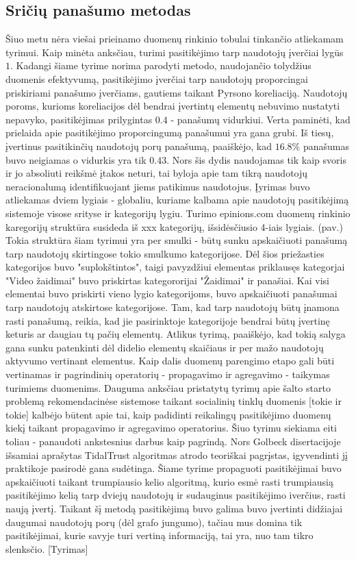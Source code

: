 \documentclass{VUMIFInfMagistrinis}
\begin{document}
\subsection{Sričių panašumo metodas}
\indent
Šiuo metu nėra viešai prieinamo duomenų rinkinio tobulai tinkančio atliekamam tyrimui.  Kaip minėta anksčiau, turimi pasitikėjimo tarp naudotojų įverčiai lygūs $1$. Kadangi šiame tyrime norima parodyti metodo, naudojančio tolydžius duomenis efektyvumą, pasitikėjimo įverčiai tarp naudotojų proporcingai priskiriami panašumo įverčiams, gautiems taikant Pyrsono koreliaciją. Naudotojų poroms, kurioms koreliacijos dėl bendrai įvertintų elementų nebuvimo nustatyti nepavyko, pasitikėjimas prilygintas $0.4$ - panašumų vidurkiui. Verta paminėti, kad prielaida apie pasitikėjimo proporcingumą panašumui yra gana grubi. Iš tiesų, įvertinus pasitikinčių naudotojų porų panašumą, paaiškėjo, kad $16.8\%$ panašumas buvo neigiamas o vidurkis yra tik  $0.43$. Nors šis dydis naudojamas tik kaip svoris ir jo absoliuti reikšmė įtakos neturi, tai byloja apie tam tikrą naudotojų neracionalumą identifikuojant jiems patikimus naudotojus. 
\indent
Įyrimas buvo atliekamas dviem lygiais - globaliu, kuriame kalbama apie naudotojų pasitikėjimą sistemoje visose srityse ir kategorijų lygiu. Turimo epinions.com duomenų rinkinio karegorijų struktūra susideda iš xxx kategorijų, išsidėsčiusio 4-iais lygiais. (pav.) Tokia struktūra šiam tyrimui yra per smulki - būtų sunku apskaičiuoti panašumą tarp naudotojų skirtingose tokio smulkumo kategorijose. Dėl šios priežasties kategorijos buvo "suplokštintos", taigi pavyzdžiui elementas priklausęs kategorjai "Video žaidimai" buvo priskirtas kategororijai "Žaidimai" ir panašiai. Kai visi elementai buvo  priskirti vieno lygio kategorijoms, buvo apskaičiuoti panašumai tarp naudotojų atskirtose kategorijose. Tam, kad tarp naudotojų būtų įnamona rasti panašumą, reikia, kad jie pasirinktoje kategorijoje bendrai būtų įvertinę keturis ar daugiau tų pačių elementų. Atlikus tyrimą, paaiškėjo, kad tokią salyga gana sunku patenkinti dėl didelio elementų skaičiaus ir per mažo naudotojų aktyvumo vertinant elementus.
\newline
\indent
Kaip dalis duomenų parengimo etapo gali būti vertinamas ir pagrindinių operatorių - propagavimo ir agregavimo - taikymas turimiems duomenims. Dauguma anksčiau pristatytų tyrimų apie šalto starto problemą rekomendacinėse sistemose taikant socialinių tinklų duomenis [tokie ir tokie] kalbėjo būtent apie tai, kaip padidinti reikalingų pasitikėjimo duomenų kiekį taikant propagavimo ir agregavimo operatorius. Šiuo tyrimu siekiama eiti toliau - panaudoti ankstesnius darbus kaip pagrindą. Nors Golbeck disertacijoje išsamiai aprašytas TidalTrust algoritmas atrodo teoriškai pagrįstas, igyvendinti jį praktikoje pasirodė gana sudėtinga. Šiame tyrime propaguoti pasitikėjimai buvo apskaičiuoti taikant trumpiausio kelio algoritmą, kurio esmė rasti trumpiausią pasitikėjimo kelią tarp dviejų naudotojų ir sudauginus pasitikėjimo iverčius, rasti naują įvertį. Taikant šį metodą pasitikėjimą buvo galima buvo įvertinti didžiajai daugumai naudotojų porų (dėl grafo jungumo), tačiau mus domina tik pasitikėjimai, kurie savyje turi vertiną informaciją, tai yra, nuo tam tikro slenksčio. [Tyrimas]
\end{document}
